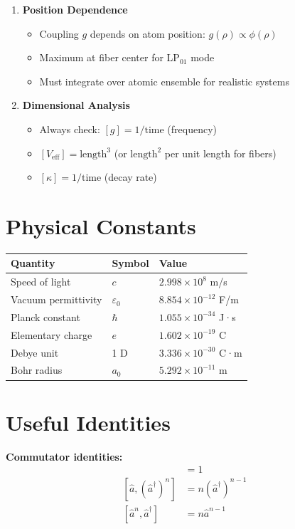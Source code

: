 \documentclass[12pt,a4paper]{article}
\begin{document}
\begin{enumerate}[leftmargin=*]
\item \textbf{Position Dependence}
\begin{itemize}
\item Coupling $g$ depends on atom position: $g(\rho) \propto \phi(\rho)$
\item Maximum at fiber center for LP$_{01}$ mode
\item Must integrate over atomic ensemble for realistic systems
\end{itemize}

\item \textbf{Dimensional Analysis}
\begin{itemize}
\item Always check: $[g] = 1/\text{time}$ (frequency)
\item $[V_{\text{eff}}] = \text{length}^3$ (or $\text{length}^2$ per unit length for fibers)
\item $[\kappa] = 1/\text{time}$ (decay rate)
\end{itemize}
\end{enumerate}

\appendix

\section{Physical Constants}

\begin{center}
\begin{tabular}{lll}
\hline
Quantity & Symbol & Value \\
\hline
Speed of light & $c$ & $2.998 \times 10^8$ m/s \\
Vacuum permittivity & $\varepsilon_0$ & $8.854 \times 10^{-12}$ F/m \\
Planck constant & $\hbar$ & $1.055 \times 10^{-34}$ J·s \\
Elementary charge & $e$ & $1.602 \times 10^{-19}$ C \\
Debye unit & 1 D & $3.336 \times 10^{-30}$ C·m \\
Bohr radius & $a_0$ & $5.292 \times 10^{-11}$ m \\
\hline
\end{tabular}
\end{center}

\section{Useful Identities}

\textbf{Commutator identities:}
\begin{align}
[\hat{a}, \hat{a}^\dagger] &= 1\\
[\hat{a}, (\hat{a}^\dagger)^n] &= n(\hat{a}^\dagger)^{n-1}\\
[\hat{a}^n, \hat{a}^\dagger] &= n\hat{a}^{n-1}
\end{align}
\end{document}
